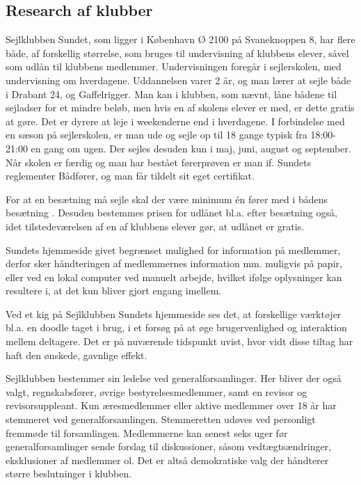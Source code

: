 \subsection{Research af klubber}\label{subsec:research}

Sejlklubben Sundet, som ligger i København Ø 2100 på Svaneknoppen 8, har flere både, af forskellig størrelse, som bruges
til undervisning af klubbens elever, såvel som udlån til klubbens medlemmer. Undervisningen foregår i sejlerskolen, med
undervisning om hverdagene. Uddannelsen varer 2 år, og man lærer at sejle både i Drabant 24, og
Gaffelrigger. Man kan i klubben, som nævnt, låne bådene
til sejladser for et mindre beløb, men hvis en af skolens elever er med, er dette gratis
at gøre. Det er dyrere at leje i weekenderne end i hverdagene. I forbindelse med en sæson på sejlerskolen, er man ude
og sejle op til 18 gange typisk fra 18:00-21:00 en gang om ugen. Der sejles desuden kun i maj, juni, august og
september. Når skolen er færdig og man har bestået førerprøven er man if. Sundets reglementer Bådfører, og man får
tildelt sit eget certifikat.

For at en besætning må sejle skal der være minimum én fører med i bådens besætning . Desuden bestemmes prisen for udlånet bl.a. efter besætning også, idet tilstedeværelsen af en af klubbens elever
gør, at udlånet er gratis.\citep{Sundet}

Sundets hjemmeside givet begrænset mulighed for information på medlemmer, derfor sker håndteringen af medlemmernes
information mm. muligvis på papir, eller ved en lokal computer ved manuelt arbejde, hvilket ifølge oplysninger
 kan resultere i, at det kun bliver gjort engang imellem.

Ved et kig på Sejlklubben Sundets hjemmeside \citep{SundetUdlaan} ses det, at forskellige værktøjer bl.a. en doodle
taget i brug, i et forsøg på at øge brugervenlighed og interaktion mellem deltagere. Det er på nuværende tidspunkt
uvist, hvor vidt disse tiltag har haft den ønskede, gavnlige effekt.

Sejlklubben bestemmer sin ledelse ved generalforsamlinger. Her bliver der også valgt, regnskabsfører, øvrige
bestyrelsesmedlemmer, samt en revisor og revisorsuppleant. Kun æresmedlemmer eller aktive medlemmer over 18 år har
stemmeret ved generalforsamlingen. Stemmeretten udøves ved personligt fremmøde til forsamlingen. Medlemmerne kan senest
seks uger før generalforsamlinger sende forslag til diskussioner, såsom vedtægtsændringer, eksklusioner af medlemmer ol.
Det er altså demokratiske valg der håndterer større beslutninger i klubben.

